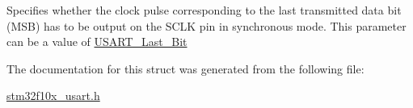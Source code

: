 \label{structUSART__ClockInitTypeDef_ab1b28d63d2be6e57849666d78a4467bd}
Specifies whether the clock pulse corresponding to the last transmitted data bit (MSB) has to be output on the SCLK pin in synchronous mode. This parameter can be a value of \hyperlink{group__USART__Last__Bit}{USART\_\-Last\_\-Bit} 

The documentation for this struct was generated from the following file:\begin{DoxyCompactItemize}
\item 
\hyperlink{stm32f10x__usart_8h}{stm32f10x\_\-usart.h}\end{DoxyCompactItemize}
